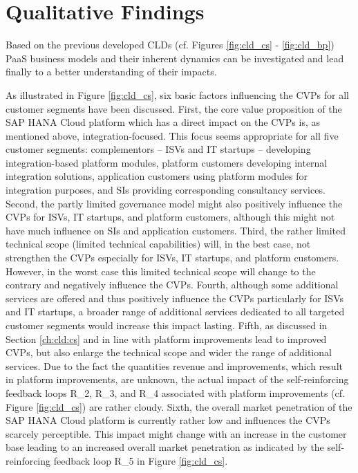 \section{Qualitative Findings}\label{ch:poc:qf}

Based on the previous developed \acp{CLD} (cf. Figures \ref{fig:cld_cs} - \ref{fig:cld_bp}) \ac{PaaS} business models and their inherent dynamics can be investigated and lead finally to a better understanding of their impacts.

As illustrated in Figure \ref{fig:cld_cs}, six basic factors influencing the \acp{CVP} for all customer segments have been discussed. First, the core value proposition of the SAP HANA Cloud platform which has a direct impact on the \acp{CVP} is, as mentioned above, integration-focused. This focus seems appropriate for all five customer segments: complementors -- \acp{ISV} and \ac{IT} startups -- developing integration-based platform modules, platform customers developing internal integration solutions, application customers using platform modules for integration purposes, and \acp{SI} providing corresponding consultancy services. Second, the partly limited governance model might also positively influence the \acp{CVP} for \acp{ISV}, \ac{IT} startups, and platform customers, although this might not have much influence on \acp{SI} and application customers. Third, the rather limited technical scope (limited technical capabilities) will, in the best case, not strengthen the \acp{CVP} especially for \acp{ISV}, \ac{IT} startups, and platform customers. However, in the worst case this limited technical scope will change to the contrary and negatively influence the \acp{CVP}. Fourth, although some additional services are offered and thus positively influence the \acp{CVP} particularly for \acp{ISV} and \ac{IT} startups, a broader range of additional services dedicated to all targeted customer segments would increase this impact lasting. Fifth, as discussed in Section \ref {ch:cld:cs} and in line with \citet[p. 200]{Evans2003} platform improvements lead to improved \acp{CVP}, but also enlarge the technical scope and wider the range of additional services. Due to the fact the quantities revenue and improvements, which result in platform improvements, are unknown, the actual impact of the self-reinforcing feedback loops R\_2, R\_3, and R\_4 associated with platform improvements (cf. Figure \ref{fig:cld_cs}) are rather cloudy. Sixth, the overall market penetration of the SAP HANA Cloud platform is currently rather low and influences the \acp{CVP} scarcely perceptible. This impact might change with an increase in the customer base leading to an increased overall market penetration as indicated by the self-reinforcing feedback loop R\_5 in Figure \ref{fig:cld_cs}.

